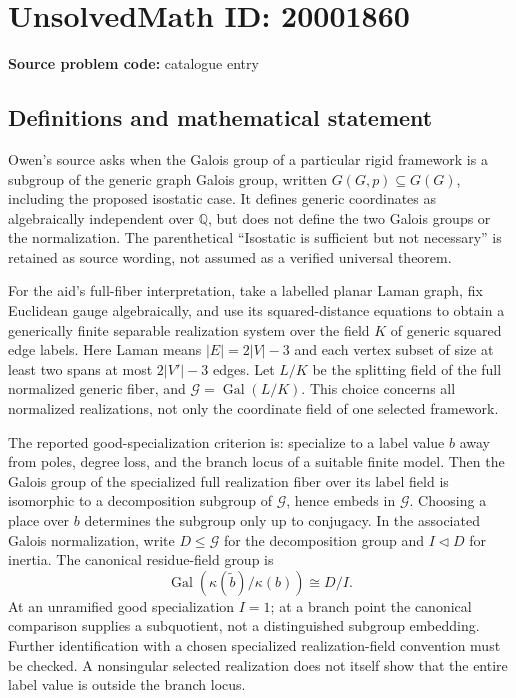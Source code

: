 \documentclass[11pt]{article}
\newcommand{\Q}{\mathbb{Q}}
\begin{document}
\section*{UnsolvedMath ID: 20001860}
\textbf{Source problem code:} catalogue entry
\subsection{Definitions and mathematical statement}
Owen's source asks when the Galois group of a particular rigid framework is a subgroup of the generic graph Galois group, written \(G(G,p)\subseteq G(G)\), including the proposed isostatic case. It defines generic coordinates as algebraically independent over \(\Q\), but does not define the two Galois groups or the normalization. The parenthetical ``Isostatic is sufficient but not necessary'' is retained as source wording, not assumed as a verified universal theorem.

For the aid's full-fiber interpretation, take a labelled planar Laman graph, fix Euclidean gauge algebraically, and use its squared-distance equations to obtain a generically finite separable realization system over the field \(K\) of generic squared edge labels. Here Laman means \(|E|=2|V|-3\) and each vertex subset of size at least two spans at most \(2|V'|-3\) edges. Let \(L/K\) be the splitting field of the full normalized generic fiber, and \(\mathcal G=\operatorname{Gal}(L/K)\). This choice concerns all normalized realizations, not only the coordinate field of one selected framework.

The reported good-specialization criterion is: specialize to a label value \(b\) away from poles, degree loss, and the branch locus of a suitable finite model. Then the Galois group of the specialized full realization fiber over its label field is isomorphic to a decomposition subgroup of \(\mathcal G\), hence embeds in \(\mathcal G\). Choosing a place over \(b\) determines the subgroup only up to conjugacy. In the associated Galois normalization, write \(D\leq\mathcal G\) for the decomposition group and \(I\triangleleft D\) for inertia. The canonical residue-field group is
\[
 \operatorname{Gal}(\kappa(\widetilde b)/\kappa(b))\cong D/I.
\]
At an unramified good specialization \(I=1\); at a branch point the canonical comparison supplies a subquotient, not a distinguished subgroup embedding. Further identification with a chosen specialized realization-field convention must be checked. A nonsingular selected realization does not itself show that the entire label value is outside the branch locus.
\end{document}
